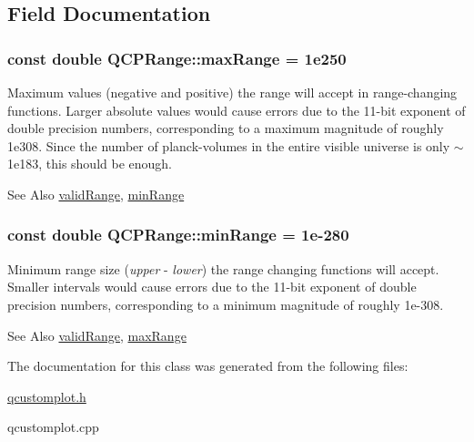 \subsection{Field Documentation}
\hypertarget{classQCPRange_a5ca51e7a2dc5dc0d49527ab171fe1f4f}{
\subsubsection[{max\-Range}]{\setlength{\rightskip}{0pt plus 5cm}const double Q\-C\-P\-Range\-::max\-Range = 1e250\hspace{0.3cm}{\ttfamily [static]}}}\label{classQCPRange_a5ca51e7a2dc5dc0d49527ab171fe1f4f}
Maximum values (negative and positive) the range will accept in range-\/changing functions. Larger absolute values would cause errors due to the 11-\/bit exponent of double precision numbers, corresponding to a maximum magnitude of roughly 1e308. Since the number of planck-\/volumes in the entire visible universe is only $\sim$1e183, this should be enough. \begin{DoxySeeAlso}{See Also}
\hyperlink{classQCPRange_ab38bd4841c77c7bb86c9eea0f142dcc0}{valid\-Range}, \hyperlink{classQCPRange_ab46d3bc95030ee25efda41b89e2b616b}{min\-Range} 
\end{DoxySeeAlso}
\hypertarget{classQCPRange_ab46d3bc95030ee25efda41b89e2b616b}{
\subsubsection[{min\-Range}]{\setlength{\rightskip}{0pt plus 5cm}const double Q\-C\-P\-Range\-::min\-Range = 1e-\/280\hspace{0.3cm}{\ttfamily [static]}}}\label{classQCPRange_ab46d3bc95030ee25efda41b89e2b616b}
Minimum range size ({\itshape upper} -\/ {\itshape lower}) the range changing functions will accept. Smaller intervals would cause errors due to the 11-\/bit exponent of double precision numbers, corresponding to a minimum magnitude of roughly 1e-\/308. \begin{DoxySeeAlso}{See Also}
\hyperlink{classQCPRange_ab38bd4841c77c7bb86c9eea0f142dcc0}{valid\-Range}, \hyperlink{classQCPRange_a5ca51e7a2dc5dc0d49527ab171fe1f4f}{max\-Range} 
\end{DoxySeeAlso}


The documentation for this class was generated from the following files\-:\begin{DoxyCompactItemize}
\item 
\hyperlink{qcustomplot_8h}{qcustomplot.\-h}\item 
qcustomplot.\-cpp\end{DoxyCompactItemize}
